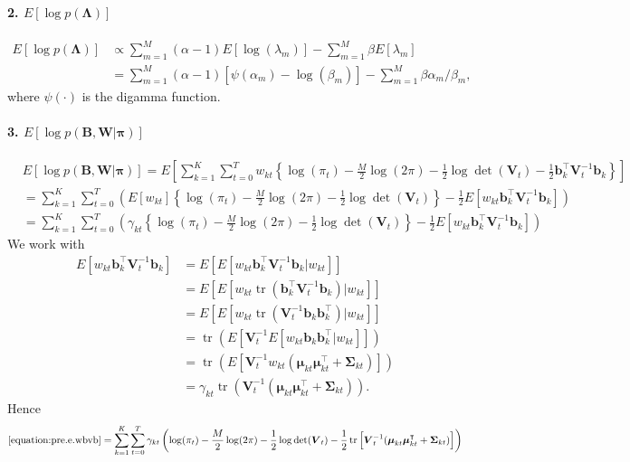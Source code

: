 \documentclass[11pt,authoryear]{article}
\DeclareMathOperator*{\tr}{tr}
\newcommand{\bs}[1]{\boldsymbol{#1}}
\begin{document}
\paragraph{2. $E[\log p(\bs{\Lambda})]$}
\begin{align}
E[\log p(\bs{\Lambda})] &\propto \sum_{m = 1}^M (\alpha - 1)E[\log(\lambda_m)] - \sum_{m = 1}^M\beta E[\lambda_m]\\
&= \sum_{m = 1}^M (\alpha - 1)[\psi(\alpha_m) - \log(\beta_m)] - \sum_{m = 1}^M\beta \alpha_m/\beta_m,
\end{align}
where $\psi(\cdot)$ is the digamma function.

\paragraph{3. $E[\log p(\bs{B}, \bs{W} | \bs{\pi})]$}
\begin{align}
&E[\log p(\bs{B}, \bs{W} | \bs{\pi})] = E\left[\sum_{k = 1}^K \sum_{t = 0}^T w_{kt}\left\{\log(\pi_t) - \frac{M}{2}\log(2\pi) - \frac{1}{2}\log\det(\bs{V}_t) - \frac{1}{2}\bs{b}_k^{\intercal}\bs{V}_t^{-1}\bs{b}_k\right\}\right]\\
&= \sum_{k = 1}^K \sum_{t = 0}^T \left(E\left[w_{kt}\right]\left\{\log(\pi_t) - \frac{M}{2}\log(2\pi) - \frac{1}{2}\log\det(\bs{V}_t)\right\} - \frac{1}{2}E\left[w_{kt}\bs{b}_k^{\intercal}\bs{V}_t^{-1}\bs{b}_k\right]\right)\\
\label{equation:pre.e.wbvb}&= \sum_{k = 1}^K \sum_{t = 0}^T \left(\gamma_{kt}\left\{\log(\pi_t) - \frac{M}{2}\log(2\pi) - \frac{1}{2}\log\det(\bs{V}_t)\right\} - \frac{1}{2}E\left[w_{kt}\bs{b}_k^{\intercal}\bs{V}_t^{-1}\bs{b}_k\right]\right)
\end{align}
We work with
\begin{align}
E\left[w_{kt}\bs{b}_k^{\intercal}\bs{V}_t^{-1}\bs{b}_k\right] &= E\left[E\left[w_{kt}\bs{b}_k^{\intercal}\bs{V}_t^{-1}\bs{b}_k|w_{kt}\right]\right]\\
&= E\left[E\left[w_{kt}\tr\left(\bs{b}_k^{\intercal}\bs{V}_t^{-1}\bs{b}_k\right)|w_{kt}\right]\right]\\
&= E\left[E\left[w_{kt}\tr\left(\bs{V}_t^{-1}\bs{b}_k\bs{b}_k^{\intercal}\right)|w_{kt}\right]\right]\\
&= \tr\left(E\left[\bs{V}_t^{-1}E\left[w_{kt}\bs{b}_k\bs{b}_k^{\intercal}|w_{kt}\right]\right]\right)\\
&= \tr\left(E\left[\bs{V}_t^{-1}w_{kt}(\bs{\mu}_{kt}\bs{\mu}_{kt}^{\intercal} + \bs{\Sigma}_{kt})\right]\right)\\
&= \gamma_{kt}\tr\left(\bs{V}_t^{-1}(\bs{\mu}_{kt}\bs{\mu}_{kt}^{\intercal} + \bs{\Sigma}_{kt})\right).
\end{align}
Hence
\begin{align}
\eqref{equation:pre.e.wbvb} = \sum_{k = 1}^K \sum_{t = 0}^T \gamma_{kt}\left(\log(\pi_t) - \frac{M}{2}\log(2\pi) - \frac{1}{2}\log\det(\bs{V}_t) - \frac{1}{2}\tr\left[\bs{V}_t^{-1}(\bs{\mu}_{kt}\bs{\mu}_{kt}^{\intercal} + \bs{\Sigma}_{kt})\right]\right)
\end{align}
\end{document}
